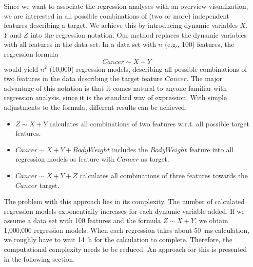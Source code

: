 \documentclass[journal]{style/vgtc} 			          %
\newcommand{\com}[1]{\textcolor{orange}{\uline{#1}}}
\begin{document}
Since we want to associate the regression analyses with an overview visualization, we are interested in all possible combinations of (two or more) independent features describing a target.
We achieve this by introducing dynamic variables $X$, $Y$ and $Z$ into the regression notation.
Our method replaces the dynamic variables with all features in the data set.
In a data set with $n$ (e.g., 100) features, the regression formula
\begin{equation}
Cancer \sim X + Y
\end{equation}
would yield $n^2$ (10,000) regression models, describing all possible combinations of two features in the data describing the target feature  $Cancer$.
The major advantage of this notation is that it comes natural to anyone familiar with regression analysis, since it is the standard way of expression.
With simple adjustments to the formula, different results can be achieved:
\begin{itemize}
	\item $Z \sim X + Y$ calculates all combinations of two features w.r.t. all possible target features.
	\item $Cancer \sim X + Y + BodyWeight$ includes the $BodyWeight$ feature into all regression models as feature with $Cancer$ as target.
	\item $Cancer \sim X + Y + Z$ calculates all combinations of three features towards the $Cancer$ target.
\end{itemize}
The problem with this approach lies in its complexity.
The number of calculated regression models exponentially increases for each dynamic variable added.
If we assume a data set with 100 features and the formula $Z \sim X + Y$, we obtain 1,000,000 regression models.
When each regression takes about 50~ms calculation, we roughly have to wait 14~h for the calculation to complete.
Therefore, the computational complexity needs to be reduced.
An approach for this is presented in the following section.
\end{document}
